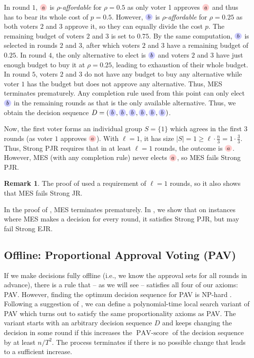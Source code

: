 \documentclass[10pt]{scrartcl}
\theoremstyle{plain}
\theoremstyle{definition}
\newtheorem{remark}[theorem]{Remark}
\renewcommand*{\ge}{\geqslant}
\newcommand{\alternativea}{\tikz[baseline=-3pt,transform shape,scale=0.85]{\node[text height=6pt,inner sep=1pt,fill=red!20,    circle,minimum width=12pt] (x) {$a$};}}
\newcommand{\alternativeb}{\tikz[baseline=-3pt,transform shape,scale=0.85]{\node[text height=6pt,inner sep=1pt,fill=blue!20,   circle,minimum width=12pt] (x) {$b$};}}
\begin{document}
In round $1$, $\alternativea$ is $\rho$-\emph{affordable} for $\rho = 0.5$ as only voter 1 approves $\alternativea$ and thus has to bear its whole cost of $p = 0.5$. However, $\alternativeb$ is $\rho$-\emph{affordable} for $\rho = 0.25$ as both voters $2$ and $3$ approve it, so they can equally divide the cost $p$. The remaining budget of voters $2$ and $3$ is set to $0.75$. By the same computation, $\alternativeb$ is selected in rounds $2$ and $3$, after which voters $2$ and $3$ have a remaining budget of $0.25$. In round $4$, the only alternative to elect is $\alternativeb$ and voters $2$ and $3$ have just enough budget to buy it at $\rho = 0.25$, leading to exhaustion of their whole budget. In round $5$, voters $2$ and $3$ do not have any budget to buy any alternative while voter $1$ has the budget but does not approve any alternative. Thus, MES terminates prematurely. Any completion rule used from this point can only elect $\alternativeb$ in the remaining rounds as that is the only available alternative. Thus, we obtain the decision sequence $D = (\alternativeb, \alternativeb, \alternativeb, \alternativeb, \alternativeb, \alternativeb)$.

Now, the first voter forms an individual group $S = \{1\}$ which agrees in the first 3 rounds (as voter $1$ approves $\alternativea$). With $\ell = 1$, it has size $|S| = 1 \ge \ell \cdot \frac{n}{3} = 1 \cdot \frac33$. Thus, Strong PJR requires that in at least $\ell = 1$ rounds, the outcome is $\alternativea$. However, MES (with any completion rule) never elects $\alternativea$, so MES fails Strong PJR. \hfill\qedsymbol

\smallskip
\begin{remark}
	The proof of  used a requirement of $\ell = 1$ rounds, so it also shows that MES fails Strong JR.
\end{remark}

In the proof of , MES terminates prematurely. In , we show that on instances where MES makes a decision for every round, it satisfies Strong PJR, but may fail Strong EJR.

\subsection{Offline: Proportional Approval Voting (PAV)}
\label{sec:guarantees:pav}

If we make decisions fully offline (i.e., we know the approval sets for all rounds in advance), there is a rule that -- as we will see -- satisfies all four of our axioms: PAV.
However, finding the optimum decision sequence for PAV is NP-hard \citep{aziz2015computational,approvalbasedapportionment}. Following a suggestion of \citet{aziz2018complexity}, we can define a polynomial-time local search variant of PAV which turns out to satisfy the same proportionality axioms as PAV. The variant starts with an arbitrary decision sequence $D$ and keeps changing the decision in some round if this increases the $\operatorname{PAV-score}$ of the decision sequence by at least $n/T^2$. The process terminates if there is no possible change that leads to a sufficient increase. 
\end{document}
